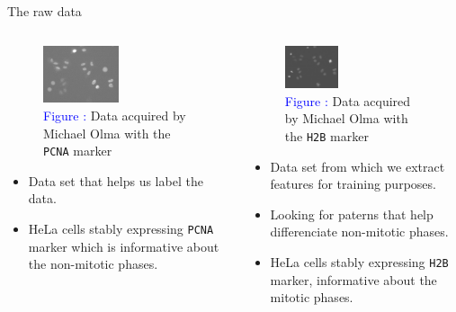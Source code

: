 \documentclass{beamer}
\begin{document}
\begin{frame}{The raw data}
\begin{columns}[T] %
\begin{column}{.40\textwidth}
\begin{footnotesize}
\begin{figure}[!ht]
\centering
\includegraphics[width=0.50\textwidth]{Images/PCNA.png}
\caption{\textcolor{blue}{Figure :} Data acquired by Michael Olma with the \texttt{PCNA} marker}
\label{PCNA_michael_olma}
\end{figure}
\begin{itemize}
\item Data set that helps us label the data.
\item HeLa cells stably expressing \texttt{PCNA} marker which is informative about the non-mitotic phases.
\end{itemize}
\end{footnotesize}
\end{column}%
\hfill%
\begin{column}{.56\textwidth}
\begin{footnotesize}
\begin{figure}[!ht]
\centering
\includegraphics[width=0.38\textwidth]{Images/H2B.png}
\caption{\textcolor{blue}{Figure :} Data acquired by Michael Olma with the \texttt{H2B} marker}
\label{H2B}
\end{figure}
\begin{itemize}
\item Data set from which we extract features for training purposes. 
\item Looking for paterns that help differenciate non-mitotic phases.
\item HeLa cells stably expressing \texttt{H2B} marker, informative about the mitotic phases.
\end{itemize}
\end{footnotesize}
\end{column}%
\end{columns}
\end{frame}
\end{document}
